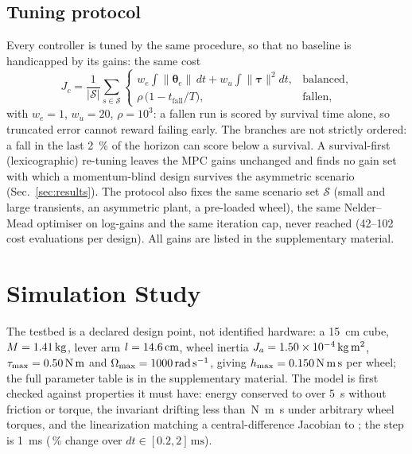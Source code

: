 \documentclass[conference]{IEEEtran}
\theoremstyle{definition}
\theoremstyle{plain}
\newcommand{\btau}{\boldsymbol{\tau}}
\newcommand{\btheta}{\boldsymbol{\theta}}
\begin{document}
\subsection{Tuning protocol}
\label{sec:tuning}

Every controller is tuned by the same procedure, so that no baseline is
handicapped by its gains: the same cost
\begin{equation}
J_c = \frac{1}{|\mathcal{S}|}\sum_{s\in\mathcal{S}}
\begin{cases}
w_e\!\int\!\|\btheta_e\|\,dt + w_u\!\int\!\|\btau\|^2 dt, & \text{balanced},\\
\rho\,\bigl(1-t_{\text{fall}}/T\bigr), & \text{fallen},
\end{cases}
\label{eq:cost}
\end{equation}
with $w_e=1$, $w_u=20$, $\rho=10^3$: a fallen run is scored by survival time
alone, so truncated error cannot reward failing early. The branches are not
strictly ordered: a fall in the last \SI{2}{\percent} of the horizon can score
below a survival. A survival-first (lexicographic) re-tuning leaves the MPC gains
unchanged and finds no gain set with which a momentum-blind design survives the
asymmetric scenario (Sec.~\ref{sec:results}). The protocol also fixes the same scenario set $\mathcal{S}$ (small and large transients, an asymmetric
plant, a pre-loaded wheel), the same Nelder--Mead optimiser on log-gains and the
same iteration cap, never reached (42--102 cost evaluations per design). All gains are listed in the supplementary material.

\section{Simulation Study}
\label{sec:study}


The testbed is a declared design point, not identified hardware: a
\SI{15}{\centi\metre} cube, $M=1.41\,\si{\kilogram}$, lever
arm $l=14.6\,\si{\centi\metre}$, wheel inertia $J_a=1.50\times10^{-4}\,
\si{\kilogram\metre\squared}$, $\tau_{\max}=0.50\,\si{\newton\metre}$ and
$\Omega_{\max}=1000\,\si{\radian\per\second}$, giving
$h_{\max}=0.150\,\si{\newton\metre\second}$ per wheel; the full parameter
table is in the supplementary material. The model is first checked against properties it
must have: energy conserved to \energyErr{} over \SI{5}{\second} without friction
or torque, the invariant drifting less than \hzDrift{}\,\si{\newton\metre\second}
under arbitrary wheel torques, and the linearization matching a
central-difference Jacobian to \jacErr{}; the step is \SI{1}{\milli\second}
(\dtErr\,\si{\percent} change over $dt\in[0.2,2]\,\si{\milli\second}$).
\end{document}
